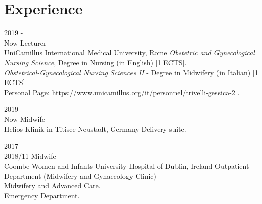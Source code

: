 \documentclass[11pt]{friggeri-cv}
\begin{document}
\vspace{-20pt}
\section{Experience}
\begin{entrylist}
  \entry
      {2019 - \\Now}
      {Lecturer}
      {\\UniCamillus International Medical University, Rome}
      {
        \emph{Obstetric and Gynecological Nursing Science}, Degree in Nursing (in English) [1 ECTS].\\
        \emph{Obstetrical-Gynecological Nursing Sciences II} - Degree in Midwifery (in Italian) [1 ECTS] \\
        Personal Page:
        \footnotesize{\url{https://www.unicamillus.org/it/personnel/trivelli-gessica-2}} .
      }
      \newpage
      
  \entry
    {2019 - \\Now}
    {Midwife}
    {\\Helios Klinik in Titisee-Neustadt, Germany}
    {Delivery suite.}
  
  \entry
    {2017 - \\2018/11}
    {Midwife}
    {\\Coombe Women and Infants University Hospital of Dublin, Ireland}
    {Outpatient Department (Midwifery and Gynaecology Clinic)\\
     Midwifery and Advanced Care.\\
     Emergency Department.}
\end{entrylist}
\end{document}
